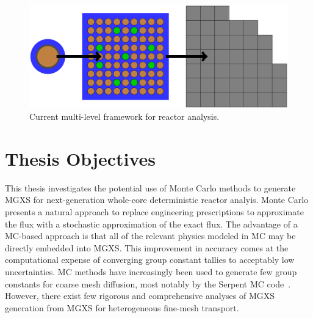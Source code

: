 
\begin{figure}
\centering
\includegraphics[width=0.9\linewidth]{figures/intro/multi-step-flow-chart}
\caption[Multi-level approach to reactor analysis]{Current multi-level framework for reactor analysis.}
\label{fig:chap1-multi-level-flow-chart}
\end{figure}


\section{Thesis Objectives}
\label{sec:chap1-objectives}

This thesis investigates the potential use of Monte Carlo methods to generate \ac{MGXS} for next-generation whole-core deterministic reactor analyis. Monte Carlo presents a natural approach to replace engineering prescriptions to approximate the flux with a stochastic approximation of the exact flux. The advantage of a \ac{MC}-based approach is that all of the relevant physics modeled in \ac{MC} may be directly embedded into \ac{MGXS}. This improvement in accuracy comes at the computational expense of converging group constant tallies to acceptably low uncertainties. \ac{MC} methods have increasingly been used to generate few group constants for coarse mesh diffusion, most notably by the Serpent \ac{MC} code~\cite{serpent2013manual}. However, there exist few rigorous and comprehensive analyses of \ac{MGXS} generation from \ac{MGXS} for heterogeneous fine-mesh transport.

